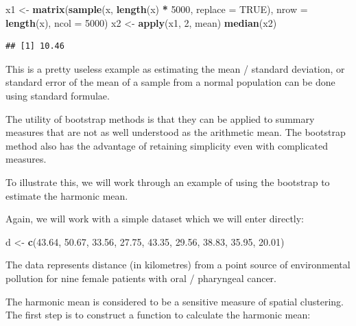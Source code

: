 \documentclass[12pt,a4paper]{book}
\newenvironment{Shaded}{\begin{snugshade}}{\end{snugshade}}
\newcommand{\DataTypeTok}[1]{\textcolor[rgb]{0.13,0.29,0.53}{#1}}
\newcommand{\DecValTok}[1]{\textcolor[rgb]{0.00,0.00,0.81}{#1}}
\newcommand{\FloatTok}[1]{\textcolor[rgb]{0.00,0.00,0.81}{#1}}
\newcommand{\KeywordTok}[1]{\textcolor[rgb]{0.13,0.29,0.53}{\textbf{#1}}}
\newcommand{\NormalTok}[1]{#1}
\newcommand{\OperatorTok}[1]{\textcolor[rgb]{0.81,0.36,0.00}{\textbf{#1}}}
\newcommand{\OtherTok}[1]{\textcolor[rgb]{0.56,0.35,0.01}{#1}}
\newcommand{\StringTok}[1]{\textcolor[rgb]{0.31,0.60,0.02}{#1}}
\theoremstyle{definition}
\theoremstyle{definition}
\theoremstyle{definition}
\theoremstyle{remark}
\begin{document}
\begin{Shaded}
\begin{Highlighting}[]
\NormalTok{x1 <-}\StringTok{ }\KeywordTok{matrix}\NormalTok{(}\KeywordTok{sample}\NormalTok{(x, }\KeywordTok{length}\NormalTok{(x) }\OperatorTok{*}\StringTok{ }\DecValTok{5000}\NormalTok{, }\DataTypeTok{replace =} \OtherTok{TRUE}\NormalTok{),}
             \DataTypeTok{nrow =} \KeywordTok{length}\NormalTok{(x), }\DataTypeTok{ncol =} \DecValTok{5000}\NormalTok{)}
\NormalTok{x2 <-}\StringTok{ }\KeywordTok{apply}\NormalTok{(x1, }\DecValTok{2}\NormalTok{, mean)}
\KeywordTok{median}\NormalTok{(x2)}
\end{Highlighting}
\end{Shaded}

\begin{verbatim}
## [1] 10.46
\end{verbatim}

This is a pretty useless example as estimating the mean / standard
deviation, or standard error of the mean of a sample from a normal
population can be done using standard formulae.

The utility of bootstrap methods is that they can be applied to summary
measures that are not as well understood as the arithmetic mean. The
bootstrap method also has the advantage of retaining simplicity even
with complicated measures.

To illustrate this, we will work through an example of using the
bootstrap to estimate the harmonic mean.

Again, we will work with a simple dataset which we will enter directly:

\begin{Shaded}
\begin{Highlighting}[]
\NormalTok{d <-}\StringTok{ }\KeywordTok{c}\NormalTok{(}\FloatTok{43.64}\NormalTok{, }\FloatTok{50.67}\NormalTok{, }\FloatTok{33.56}\NormalTok{, }\FloatTok{27.75}\NormalTok{, }\FloatTok{43.35}\NormalTok{, }\FloatTok{29.56}\NormalTok{, }\FloatTok{38.83}\NormalTok{, }\FloatTok{35.95}\NormalTok{, }\FloatTok{20.01}\NormalTok{)}
\end{Highlighting}
\end{Shaded}

The data represents distance (in kilometres) from a point source of
environmental pollution for nine female patients with oral / pharyngeal
cancer.

The harmonic mean is considered to be a sensitive measure of spatial
clustering. The first step is to construct a function to calculate the
harmonic mean:
\end{document}
